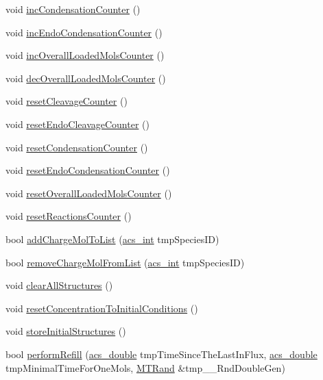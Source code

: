 \begin{DoxyCompactItemize}
\item 
void \hyperlink{classenvironment_a3fae8e57fad9ef5b182e32d9bb9989af}{inc\-Condensation\-Counter} ()
\item 
void \hyperlink{classenvironment_a01812d540519696ab07c9f822119cc64}{inc\-Endo\-Condensation\-Counter} ()
\item 
void \hyperlink{classenvironment_a719b14624d9a2f891b8d4eb47649a00e}{inc\-Overall\-Loaded\-Mols\-Counter} ()
\item 
void \hyperlink{classenvironment_a6686b0489ed94f11c4b03c011978f9af}{dec\-Overall\-Loaded\-Mols\-Counter} ()
\item 
void \hyperlink{classenvironment_a0b1e324c651c86cb54279e022c14dc6d}{reset\-Cleavage\-Counter} ()
\item 
void \hyperlink{classenvironment_a3362d147de095640619d9b44f7f20bba}{reset\-Endo\-Cleavage\-Counter} ()
\item 
void \hyperlink{classenvironment_ac7deab8db2f581077da735c3542d8f1b}{reset\-Condensation\-Counter} ()
\item 
void \hyperlink{classenvironment_a55cff0bc2f8de4d3e4db471cad580a86}{reset\-Endo\-Condensation\-Counter} ()
\item 
void \hyperlink{classenvironment_abc04de785dddab4703fdcf52ccdf85f9}{reset\-Overall\-Loaded\-Mols\-Counter} ()
\item 
void \hyperlink{classenvironment_a5c8713237992b28c39199a7aea3f9ea0}{reset\-Reactions\-Counter} ()
\item 
bool \hyperlink{classenvironment_a7981c34d16c0b1e9e6ca3ea69aa3a8a3}{add\-Charge\-Mol\-To\-List} (\hyperlink{acs__headers_8h_a8d277355641a098190360234e2ebde35}{acs\-\_\-int} tmp\-Species\-I\-D)
\item 
bool \hyperlink{classenvironment_aa4830018af0b99eddefcdefad877b305}{remove\-Charge\-Mol\-From\-List} (\hyperlink{acs__headers_8h_a8d277355641a098190360234e2ebde35}{acs\-\_\-int} tmp\-Species\-I\-D)
\item 
void \hyperlink{classenvironment_aa860227725dbe5b0251a25f440773161}{clear\-All\-Structures} ()
\item 
void \hyperlink{classenvironment_a97305e36924f19e72bfc1c3d89e45931}{reset\-Concentration\-To\-Initial\-Conditions} ()
\item 
void \hyperlink{classenvironment_a7fc3937fb586db93c33f7f091dc99626}{store\-Initial\-Structures} ()
\item 
bool \hyperlink{classenvironment_a8a53821ad1675b0da50591616aac3b74}{perform\-Refill} (\hyperlink{acs__headers_8h_ab776853a005fcbf56af0424a2a4dd607}{acs\-\_\-double} tmp\-Time\-Since\-The\-Last\-In\-Flux, \hyperlink{acs__headers_8h_ab776853a005fcbf56af0424a2a4dd607}{acs\-\_\-double} tmp\-Minimal\-Time\-For\-One\-Mols, \hyperlink{class_m_t_rand}{M\-T\-Rand} \&tmp\-\_\-\-\_\-\-Rnd\-Double\-Gen)

\end{DoxyCompactItemize}
